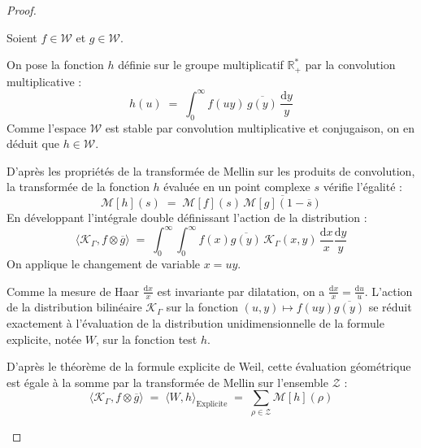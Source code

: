 \documentclass[Riemann_Hypothesis.tex]{subfiles}
\begin{document}
\begin{proof}
    \begin{part_proof}
        Soient $f \in \mathcal{W}$ et $g \in \mathcal{W}$. \par
        On pose la fonction $h$ définie sur le groupe multiplicatif $\mathbb{R}_+^*$ par la convolution multiplicative :
        \begin{equation*}
            h(u) \;=\; \int_{0}^{\infty} f(uy) \, \overline{g(y)} \, \frac{\mathrm{d}y}{y}
        \end{equation*}
        Comme l'espace $\mathcal{W}$ est stable par convolution multiplicative et conjugaison, on en déduit que $h \in \mathcal{W}$. \par
        D'après les propriétés de la transformée de Mellin sur les produits de convolution, la transformée de la fonction $h$ évaluée en un point complexe $s$ vérifie l'égalité :
        \begin{equation*}
            \mathcal{M}[h](s) \;=\; \mathcal{M}[f](s) \, \overline{\mathcal{M}[g](1 - \overline{s})}
        \end{equation*}
        En développant l'intégrale double définissant l'action de la distribution :
        \begin{equation*}
            \langle \mathcal{K}_{\Gamma}, f \otimes \overline{g} \rangle \;=\; \int_{0}^{\infty} \int_{0}^{\infty} f(x) \overline{g(y)} \, \mathcal{K}_{\Gamma}(x,y) \, \frac{\mathrm{d}x}{x} \frac{\mathrm{d}y}{y}
        \end{equation*}
        On applique le changement de variable $x = uy$. \par
        Comme la mesure de Haar $\frac{\mathrm{d}x}{x}$ est invariante par dilatation, on a $\frac{\mathrm{d}x}{x} = \frac{\mathrm{d}u}{u}$. L'action de la distribution bilinéaire $\mathcal{K}_{\Gamma}$ sur la fonction $(u, y) \mapsto f(uy)\overline{g(y)}$ se réduit exactement à l'évaluation de la distribution unidimensionnelle de la formule explicite, notée $W$, sur la fonction test $h$. \par
        D'après le théorème de la formule explicite de Weil, 
        cette évaluation géométrique est égale à la somme par la transformée de Mellin 
        sur l'ensemble $\mathcal{Z}$ :
        \begin{equation*}
            \langle \mathcal{K}_{\Gamma}, f \otimes \overline{g} \rangle \;=\; \langle W, h \rangle_{\text{Explicite}} \;=\; \sum_{\rho \in \mathcal{Z}} \mathcal{M}[h](\rho)
        \end{equation*}

\end{part_proof}
\end{proof}
\end{document}
